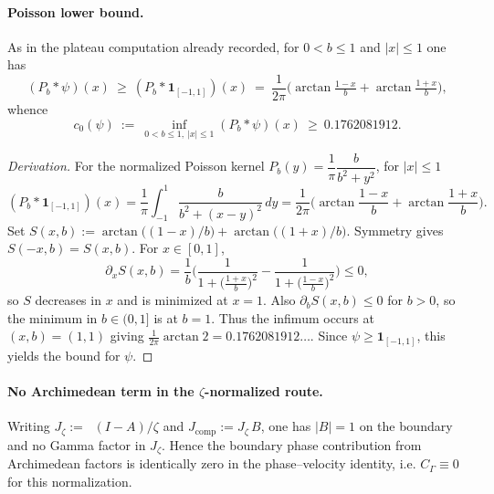\documentclass[11pt]{article}
\theoremstyle{definition}
\theoremstyle{remark}
\newcommand{\Poisson}{P}
\DeclareMathOperator{\dettwo}{det_2}
\begin{document}
\paragraph{Poisson lower bound.}
As in the plateau computation already recorded, for \(0<b\le 1\) and \(|x|\le 1\) one has
\[
 (\Poisson_b*\psi)(x)\ \ge\ (\Poisson_b*\mathbf 1_{[-1,1]})(x)
 \ =\ \frac{1}{2\pi}\Big(\arctan\tfrac{1-x}{b}+\arctan\tfrac{1+x}{b}\Big),
\]
whence
\[
 c_0(\psi)\ :=\ \inf_{0<b\le 1,\ |x|\le1}(\Poisson_b*\psi)(x)\ \ge\ 0.1762081912.
\]
\begin{proof}[Derivation]
For the normalized Poisson kernel \(P_b(y)=\dfrac{1}{\pi}\dfrac{b}{b^2+y^2}\), for \(|x|\le 1\)
\[
 (P_b*\mathbf 1_{[-1,1]})(x)=\frac{1}{\pi}\int_{-1}^{1}\frac{b}{b^2+(x-y)^2}\,dy=\frac{1}{2\pi}\Big(\arctan\frac{1-x}{b}+\arctan\frac{1+x}{b}\Big).
\]
Set \(S(x,b):=\arctan\big((1-x)/b\big)+\arctan\big((1+x)/b\big)\). Symmetry gives \(S(-x,b)=S(x,b)\). For \(x\in[0,1]\),
\[
 \partial_x S(x,b)=\frac{1}{b}\Big(\frac{1}{1+\big(\tfrac{1+x}{b}\big)^2}-\frac{1}{1+\big(\tfrac{1-x}{b}\big)^2}\Big)\le 0,
\]
so \(S\) decreases in \(x\) and is minimized at \(x=1\). Also \(\partial_b S(x,b)\le 0\) for \(b>0\), so the minimum in \(b\in(0,1]\) is at \(b=1\). Thus the infimum occurs at \((x,b)=(1,1)\) giving \(\frac{1}{2\pi}\arctan 2=0.1762081912\ldots\). Since \(\psi\ge \mathbf 1_{[-1,1]}\), this yields the bound for \(\psi\).
\end{proof}

\paragraph{No Archimedean term in the \(\zeta\)-normalized route.}
Writing \(J_\zeta:=\dettwo(I-A)/\zeta\) and \(J_{\mathrm{comp}}:=J_\zeta\,B\), one has \(|B|=1\) on the boundary and no Gamma factor in \(J_\zeta\). Hence the boundary phase contribution from Archimedean factors is identically zero in the phase–velocity identity, i.e. \(C_\Gamma\equiv 0\) for this normalization.
\end{document}
